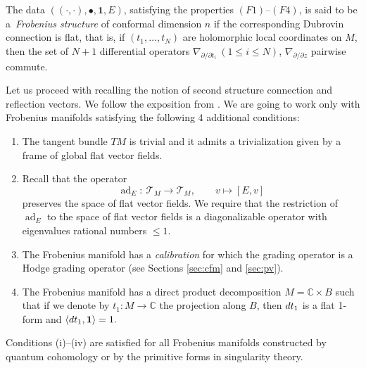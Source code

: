 \documentclass[10pt,a4paper]{article}
\numberwithin{equation}{section}
\newcommand{\CC}{\mathbb{C}}
\newcommand{\one}{\mathbf{1}}
\newcommand{\T}{\mathcal{T}}
\begin{document}
\begin{Definition}\label{def:frob-manifold}
 The data $((\cdot,\cdot), \bullet, \one, E)$, satisfying the properties
 $(F1)$--$(F4)$, is said to be a~{\em Frobenius structure} of conformal
 dimension $n$ if the corresponding Dubrovin connection is flat, that
 is, if $(t_1,\dots,t_N)$ are holomorphic local coordinates on $M$,
 then the set of $N+1$ differential operators
$
\nabla_{\partial/\partial t_i} \ (1\leq i\leq N)$,
$
\nabla_{\partial/\partial z}
$
pairwise commute.

\end{Definition}

Let us proceed with recalling the notion of second structure connection
and reflection vectors. We follow the exposition from \cite{Milanov:p2}.
We are going to work only with Frobenius manifolds satisfying the
following 4 additional conditions:
\begin{enumerate}\itemsep=0pt
\item[(i)] The tangent bundle $TM$ is trivial and it admits a
 trivialization given by a frame of global flat vector fields.
\item[(ii)]
Recall that the operator
\[
\operatorname{ad}_E\colon\ \T_M\to \T_M,\qquad v\mapsto [E,v]
\]
preserves the space of flat vector fields. We require that the
restriction of $\operatorname{ad}_E$ to the space of flat vector
fields is a diagonalizable operator with eigenvalues rational numbers
$\leq 1$.
\item[(iii)]
 The Frobenius manifold has a {\em calibration} for which the grading
 operator is a Hodge grading operator (see Sections
 \ref{sec:cfm} and \ref{sec:pv}).
\item[(iv)]
 The Frobenius manifold has a direct product decomposition
 $M=\CC\times B$ such that if we denote by $t_1\colon M\to
 \CC$ the projection along $B$, then ${\rm d}t_1$ is a flat 1-form and
 $\langle {\rm d}t_1,\mathbf{1}\rangle=1.$
\end{enumerate}
Conditions (i)--(iv) are satisfied for all Frobenius manifolds
constructed by quantum cohomology or by the primitive forms in
singularity theory.
\end{document}
